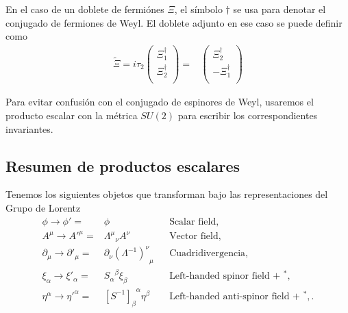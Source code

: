 En el caso de un doblete de fermiónes $\Xi$, el símbolo  $\dagger$ se usa para denotar el conjugado de fermiones de Weyl. El doblete adjunto en ese caso se puede definir como
\begin{align}
\label{eq:Xiadj}
 \widetilde{\Xi}=i\tau_2 \begin{pmatrix}
                  \Xi_1^{\dagger}\\
                  \Xi_2^{\dagger}\\
                \end{pmatrix}
=& \begin{pmatrix}
                  \Xi_2^{\dagger}\\
                 -\Xi_1^{\dagger}\\
                \end{pmatrix}
\end{align}

Para evitar confusión con el conjugado de espinores de Weyl, usaremos el producto escalar con la métrica $SU(2)$ para escribir los correspondientes invariantes.


\subsection{Resumen de productos escalares}

\begin{frame}
Tenemos los siguientes objetos que transforman bajo las representaciones del Grupo de Lorentz
\begin{align}
   \phi\to \phi'=&\phi && \text{Scalar field,}\nonumber\\
   A^\mu\to {A'}^\mu=&{\Lambda^\mu}_\nu A^\nu&&\text{Vector field,}\nonumber\\
  \partial_{\mu}\to \partial'_{\mu}=&\partial_{\nu} {\left( \Lambda^{-1} \right)^{\nu}}_{\mu}&&\text{Cuadridivergencia,}\nonumber\\
  \xi_\alpha\to\xi'_\alpha=&{S_\alpha}^\beta\xi_\beta
&& \text{Left-handed spinor field + ${}^{*}$,}\nonumber\\
\eta^{\alpha}\to {\eta'}^{\alpha} =&{\left[  S^{-1}  \right]_{\beta}}^{\alpha}\eta^\beta&&
 \text{Left-handed anti-spinor field + ${}^{*}$,}\,.
 \end{align}
\end{frame}



